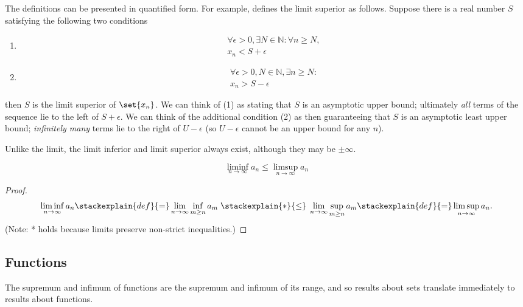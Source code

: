\documentclass{article} %
\begin{document}
\begin{remark}
The definitions can be presented in quantified form.  For example, \cite{apostol1974mathematical} defines the limit superior as follows. Suppose there is a real number $S$ satisfying the following two conditions
\begin{enumerate}
\item \begin{align*}
 \forall \epsilon > 0, \exists N \in \mathbb{N}: \forall n \geq N,\\
 x_n < S + \epsilon 	
 \end{align*}

\item \begin{align*}
 \forall \epsilon > 0, N \in \mathbb{N}, \exists n \geq N : \\
 x_n > S - \epsilon 	
 \end{align*}
\end{enumerate}
then $S$ is the limit superior of $\set{x_n}$.  We can think of (1) as stating that $S$ is an asymptotic upper bound;  ultimately \textit{all} terms of the sequence lie to the left of $S + \epsilon$.  We can think of the additional condition (2) as then guaranteeing that $S$ is an asymptotic least upper bound; \textit{infinitely many} terms lie to the right of $U - \epsilon$ (so $U - \epsilon$ cannot be an upper bound for any $n$). 
\end{remark}

Unlike the limit, the limit inferior and limit superior always exist, although they may be $\pm \infty$. 

\begin{proposition}
\[ \liminf_{n \to \infty} a_n  \leq \limsup_{n \to \infty} a_n  \]
\label{prop:liminf_upper_bounded_by_limsup}
\end{proposition}

\begin{proof}
\[\liminf_{n \to \infty} a_n  \stackexplain{def}{=} \lim_{n \to \infty} \inf_{m \geq n} a_m \; \stackexplain{*}{\leq} \;  \lim_{n \to \infty} \sup_{m \geq n} a_m \stackexplain{def}{=}  \limsup_{n \to \infty} a_n. \]
{\tiny (Note: * holds because limits preserve non-strict inequalities.)}	
\end{proof}

\subsection{Functions}

The supremum and infimum of functions are the supremum and infimum of its range, and so results about sets translate immediately to results about functions.
\end{document}
